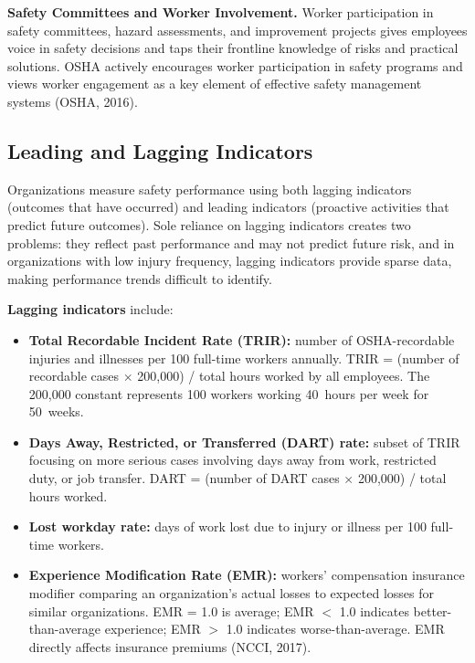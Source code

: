 \documentclass[11pt,openany]{book}
\providecommand{\tightlist}{\setlength{\itemsep}{0pt}\setlength{\parskip}{0pt}}
\begin{document}
\textbf{Safety Committees and Worker Involvement.} Worker participation in
safety committees, hazard assessments, and improvement projects gives
employees voice in safety decisions and taps their frontline knowledge of
risks and practical solutions. OSHA actively encourages worker participation
in safety programs and views worker engagement as a key element of effective
safety management systems (OSHA, 2016).

\subsection{Leading and Lagging Indicators}
\label{subsec:leading-lagging}

Organizations measure safety performance using both lagging indicators
(outcomes that have occurred) and leading indicators (proactive activities
that predict future outcomes). Sole reliance on lagging indicators creates two
problems: they reflect past performance and may not predict future risk, and
in organizations with low injury frequency, lagging indicators provide sparse
data, making performance trends difficult to identify.

\textbf{Lagging indicators} include:

\begin{itemize}\tightlist
  \item \textbf{Total Recordable Incident Rate (TRIR):} number of
        OSHA-recordable injuries and illnesses per 100 full-time workers
        annually. TRIR = (number of recordable cases \(\times\) 200{,}000) /
        total hours worked by all employees. The 200{,}000 constant represents
        100 workers working 40~hours per week for 50~weeks.
  \item \textbf{Days Away, Restricted, or Transferred (DART) rate:} subset of
        TRIR focusing on more serious cases involving days away from work,
        restricted duty, or job transfer. DART = (number of DART cases
        \(\times\) 200{,}000) / total hours worked.
  \item \textbf{Lost workday rate:} days of work lost due to injury or illness
        per 100 full-time workers.
  \item \textbf{Experience Modification Rate (EMR):} workers' compensation
        insurance modifier comparing an organization's actual losses to
        expected losses for similar organizations. EMR = 1.0 is average;
        EMR \(<\) 1.0 indicates better-than-average experience; EMR \(>\) 1.0
        indicates worse-than-average. EMR directly affects insurance premiums
        (NCCI, 2017).
\end{itemize}
\end{document}
